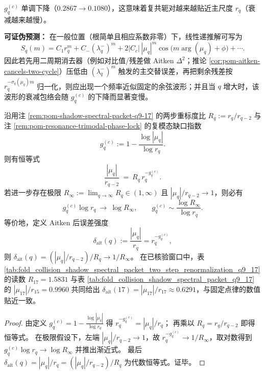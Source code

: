 \begin{remark}
\(
g_q^{(c)}
\)
单调下降（\(0.2867\to 0.1080\)），这意味着复共轭对越来越贴近主尺度 \(r_q\)（衰减越来越慢）。
\par
\textbf{可证伪预测：}
在一般位置（根简单且相应系数非零）下，线性递推解可写为
\[
S_q(m)=C_1 r_q^m + C_- (\lambda_q^-)^m + 2|C_c|\,|\mu_q|^m\cos\!\bigl(m\arg(\mu_q)+\phi\bigr)+\cdots.
\]
因此若先用二周期消去器（例如对比值/残差做 Aitken \(\Delta^2\)；推论 \ref{cor:pom-aitken-cancels-two-cycle}）压低由 \((\lambda_q^-)^m\) 触发的主交替误差，再把剩余残差按 \(r_q^{-\sigma_q(\mu_q)m}\) 归一化，则应出现一个频率近似固定的余弦波形；并且当 \(q\) 增大时，该波形的衰减包络会随 \(g_q^{(c)}\) 的下降而显著变慢。
\end{remark}

\begin{proposition}\label{prop:pom-two-step-renorm-fixed-point-loglaw}
沿用注 \ref{rem:pom-shadow-spectral-packet-q9-17} 的两步重标度比 \(R_q:=r_q/r_{q-2}\) 与注 \ref{rem:pom-resonance-trimodal-phase-lock} 的复模态缺口指数
\[
g_q^{(c)}:=1-\frac{\log|\mu_q|}{\log r_q}.
\]
则有恒等式
\[
\frac{|\mu_q|}{r_{q-2}}\ =\ R_q\,r_q^{-g_q^{(c)}}.
\]
若进一步存在极限 \(R_\infty:=\lim_{q\to\infty}R_q\in(1,\infty)\) 且 \(|\mu_q|/r_{q-2}\to 1\)，则必有
\[
g_q^{(c)}\log r_q\ \longrightarrow\ \log R_\infty,
\qquad
g_q^{(c)}\sim \frac{\log R_\infty}{\log r_q}.
\]
等价地，定义 Aitken 后误差强度
\[
\delta_{\mathrm{ait}}(q):=\frac{|\mu_q|}{r_q}=r_q^{-g_q^{(c)}},
\]
则 \(\delta_{\mathrm{ait}}(q)=(|\mu_q|/r_{q-2})/R_q\to 1/R_\infty\)。
在已核验窗口中，表 \ref{tab:fold_collision_shadow_spectral_packet_two_step_renormalization_q9_17} 的读数 \(R_{17}=1.5831\) 与表 \ref{tab:fold_collision_shadow_spectral_packet_q9_17} 的 \(|\mu_{17}|/r_{15}=0.9960\) 共同给出
\(\delta_{\mathrm{ait}}(17)=|\mu_{17}|/r_{17}\approx 0.6291\)，与固定点律的数值贴近一致。
\end{proposition}
\begin{proof}%
由定义 \(g_q^{(c)}=1-\frac{\log|\mu_q|}{\log r_q}\) 得
\(
r_q^{-g_q^{(c)}}=|\mu_q|/r_q
\)；
再乘以 \(R_q=r_q/r_{q-2}\) 即得恒等式。
在极限假设下，左端 \(|\mu_q|/r_{q-2}\to 1\)，故 \(r_q^{-g_q^{(c)}}\to 1/R_\infty\)，取对数得到 \(g_q^{(c)}\log r_q\to \log R_\infty\) 并推出渐近式。
最后 \(\delta_{\mathrm{ait}}(q)=|\mu_q|/r_q=(|\mu_q|/r_{q-2})/R_q\) 为代数恒等式。证毕。
\end{proof}

